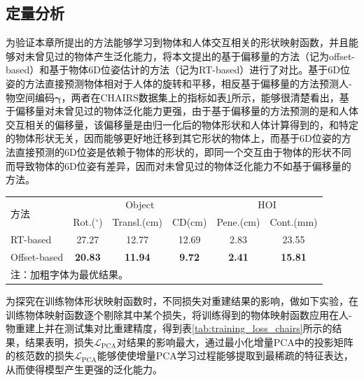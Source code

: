 \subsection{定量分析}
为验证本章所提出的方法能够学习到物体和人体交互相关的形状映射函数，并且能够对未曾见过的物体产生泛化能力，将本文提出的基于偏移量的方法（记为offset-based）和基于物体6D位姿估计的方法（记为RT-based）进行了对比。基于6D位姿的方法直接预测物体相对于人体的旋转和平移，相反基于偏移量的方法预测人-物空间编码$\mathbf{\gamma}$，两者在CHAIRS数据集上的指标如表\ref{tab:comparison_chairs}所示，能够很清楚看出，基于偏移量对未曾见过的物体泛化能力更强，由于基于偏移量的方法预测的是和人体交互相关的偏移量，该偏移量是由归一化后的物体形状和人体计算得到的，和特定的物体形状无关，因而能够更好地迁移到其它形状的物体上，而基于6D位姿的方法直接预测的6D位姿是依赖于物体的形状的，即同一个交互由于物体的形状不同而导致物体的6D位姿有差异，因而对未曾见过的物体泛化能力不如基于偏移量的方法。

\begin{table}[!htbp]
	\label{tab:comparison_chairs}
	\centering
	\footnotesize
	\setlength{\tabcolsep}{4pt}
	\renewcommand{\arraystretch}{1.2}
	\begin{tabular}{lccccc}
		\toprule
		\multirow{2}{*}{方法} & \multicolumn{3}{c}{Object} & \multicolumn{2}{c}{HOI} \\
		& Rot.($^\circ$) & Transl.(cm) & CD(cm) & Pene.(cm) & Cont.(mm) \\
		\hline
		RT-based & 27.27 & 12.77 & 12.69 & 2.83 & 23.55 \\
		Offset-based & \textbf{20.83} & \textbf{11.94} & \textbf{9.72} & \textbf{2.41} & \textbf{15.81} \\
		\bottomrule
		\multicolumn{6}{l}{注：加粗字体为最优结果。}
	\end{tabular}
\end{table}

为探究在训练物体形状映射函数时，不同损失对重建结果的影响，做如下实验，在训练物体映射函数逐个剔除其中某个损失，将训练得到的物体映射函数应用在人-物重建上并在测试集对比重建精度，得到表\ref{tab:training_loss_chairs}所示的结果，结果表明，损失$\mathcal{L}_{\text{PCA}}$对结果的影响最大，通过最小化增量PCA中的投影矩阵的核范数的损失$\mathcal{L}_{\text{PCA}}$能够使使增量PCA学习过程能够提取到最稀疏的特征表达，从而使得模型产生更强的泛化能力。

